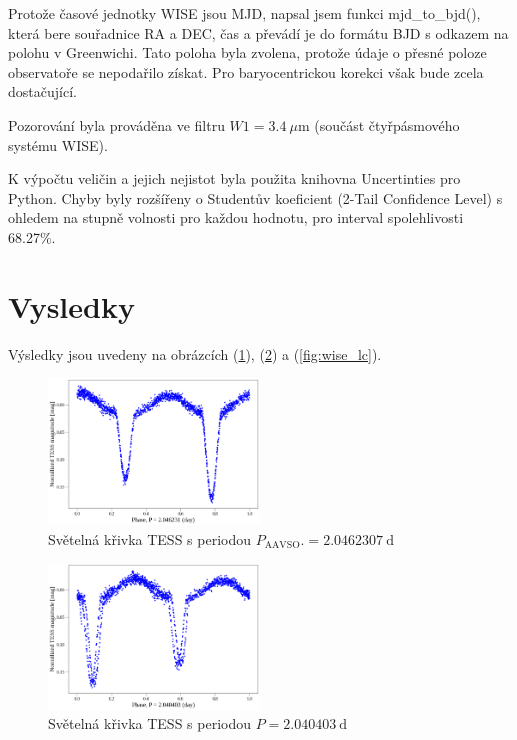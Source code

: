 \documentclass[a4paper,11pt,twocolumn]{article}
\begin{document}
            Protože časové jednotky WISE jsou MJD, napsal jsem funkci mjd\_to\_bjd(), která bere souřadnice RA a DEC, čas a převádí je do formátu BJD s odkazem na polohu v Greenwichi. Tato poloha byla zvolena, protože údaje o přesné poloze observatoře se nepodařilo získat. Pro baryocentrickou korekci však bude zcela dostačující.

            Pozorování byla prováděna ve filtru $W1 = 3.4 ~ \mu\text{m}$ (součást čtyřpásmového systému WISE). 
        
        \vspace{10pt}
        K výpočtu veličin a jejich nejistot byla použita knihovna Uncertinties pro Python. Chyby byly rozšířeny o Studentův koeficient (2-Tail Confidence Level) s ohledem na stupně volnosti pro každou hodnotu, pro interval spolehlivosti 68.27\%.

    \section{Vysledky}
        Výsledky jsou uvedeny na obrázcích (\ref{fig:tess_lc_1}), (\ref{fig:tess_lc_2}) a (\ref{fig:wise_lc}).
        
        \begin{figure}
            \centering
            \includegraphics[width=0.5\textwidth]{tess_lc_1.png}
            \caption{Světelná křivka TESS s periodou $P_{\text{AAVSO}}. = 2.0462307 ~\text{d}$}
            \label{fig:tess_lc_1}
        \end{figure}

        \begin{figure}
            \centering
            \includegraphics[width=0.5\textwidth]{tess_lc_2.png}
            \caption{Světelná křivka TESS s periodou $P = 2.040403 ~\text{d}$}
            \label{fig:tess_lc_2}
        \end{figure}
\end{document}
